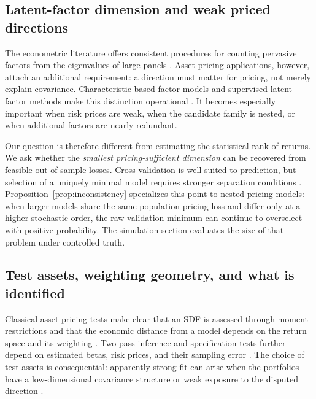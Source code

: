 \subsection{Latent-factor dimension and weak priced directions}

The econometric literature offers consistent procedures for counting pervasive factors from the eigenvalues of large panels \citep{bai2002factors,onatski2010factors,ahn2013eigenvalue}. Asset-pricing applications, however, attach an additional requirement: a direction must matter for pricing, not merely explain covariance. Characteristic-based factor models and supervised latent-factor methods make this distinction operational \citep{kelly2019characteristics,lettau2020factors}. It becomes especially important when risk prices are weak, when the candidate family is nested, or when additional factors are nearly redundant.

Our question is therefore different from estimating the statistical rank of returns. We ask whether the \emph{smallest pricing-sufficient dimension} can be recovered from feasible out-of-sample losses. Cross-validation is well suited to prediction, but selection of a uniquely minimal model requires stronger separation conditions \citep{shao1993cv,yang2007cv,arlot2010cv}. Proposition~\ref{prop:inconsistency} specializes this point to nested pricing models: when larger models share the same population pricing loss and differ only at a higher stochastic order, the raw validation minimum can continue to overselect with positive probability. The simulation section evaluates the size of that problem under controlled truth.

\subsection{Test assets, weighting geometry, and what is identified}

Classical asset-pricing tests make clear that an SDF is assessed through moment restrictions and that the economic distance from a model depends on the return space and its weighting \citep{gibbons1989test,hansen1991implications,shanken1992beta,hansen1997assessing}. Two-pass inference and specification tests further depend on estimated betas, risk prices, and their sampling error \citep{fama1992cross,jagannathan1996conditional,kan2013pricing}. The choice of test assets is consequential: apparently strong fit can arise when the portfolios have a low-dimensional covariance structure or weak exposure to the disputed direction \citep{lewellen2010skeptical}.


